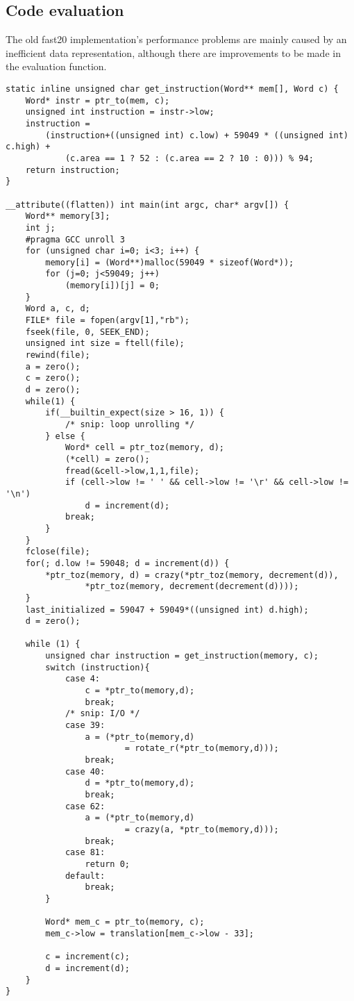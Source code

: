 \subsection{Code evaluation}

\par The old fast20 implementation's performance problems are mainly caused by an inefficient data representation, although there are improvements to be made in the evaluation function.

\begin{verbatim}
static inline unsigned char get_instruction(Word** mem[], Word c) {
    Word* instr = ptr_to(mem, c);
    unsigned int instruction = instr->low;
    instruction =
        (instruction+((unsigned int) c.low) + 59049 * ((unsigned int) c.high) +
            (c.area == 1 ? 52 : (c.area == 2 ? 10 : 0))) % 94;
    return instruction;
}

__attribute((flatten)) int main(int argc, char* argv[]) {
    Word** memory[3];
    int j;
    #pragma GCC unroll 3
    for (unsigned char i=0; i<3; i++) {
        memory[i] = (Word**)malloc(59049 * sizeof(Word*));
        for (j=0; j<59049; j++)
            (memory[i])[j] = 0;
    }
    Word a, c, d;
    FILE* file = fopen(argv[1],"rb");
    fseek(file, 0, SEEK_END);
    unsigned int size = ftell(file);
    rewind(file);
    a = zero();
    c = zero();
    d = zero();
    while(1) {
        if(__builtin_expect(size > 16, 1)) {
            /* snip: loop unrolling */
        } else {
            Word* cell = ptr_toz(memory, d);
            (*cell) = zero();
            fread(&cell->low,1,1,file);
            if (cell->low != ' ' && cell->low != '\r' && cell->low != '\n')
                d = increment(d);
            break;
        }
    }
    fclose(file);
    for(; d.low != 59048; d = increment(d)) {
        *ptr_toz(memory, d) = crazy(*ptr_toz(memory, decrement(d)),
                *ptr_toz(memory, decrement(decrement(d))));
    }
    last_initialized = 59047 + 59049*((unsigned int) d.high);
    d = zero();

    while (1) {
        unsigned char instruction = get_instruction(memory, c);
        switch (instruction){
            case 4:
                c = *ptr_to(memory,d);
                break;
            /* snip: I/O */
            case 39:
                a = (*ptr_to(memory,d)
                        = rotate_r(*ptr_to(memory,d)));
                break;
            case 40:
                d = *ptr_to(memory,d);
                break;
            case 62:
                a = (*ptr_to(memory,d)
                        = crazy(a, *ptr_to(memory,d)));
                break;
            case 81:
                return 0;
            default:
                break;
        }

        Word* mem_c = ptr_to(memory, c);
        mem_c->low = translation[mem_c->low - 33];

        c = increment(c);
        d = increment(d);
    }
}
\end{verbatim}

